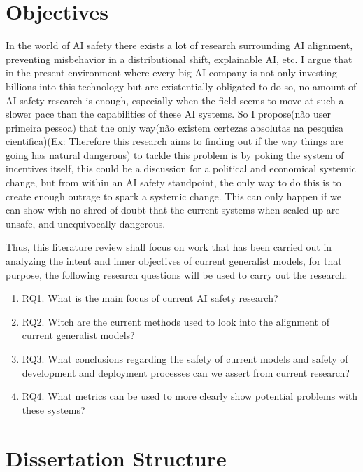 \section{Objectives}

In the world of AI safety there exists a lot of research surrounding AI alignment, preventing misbehavior in a distributional shift, explainable AI, etc. I argue that in the present environment where every big AI company is not only investing billions into this technology but are existentially obligated to do so, no amount of AI safety research is enough, especially when the field seems to move at such a slower pace than the capabilities of these AI systems. So I propose(não user primeira pessoa) that the only way(não existem certezas absolutas na pesquisa cientifica)(Ex: Therefore this research aims to finding out if the way things are going has natural dangerous) to tackle this problem is by poking the system of incentives itself, this could be a discussion for a political and economical systemic change, but from within an AI safety standpoint, the only way to do this is to create enough outrage to spark a systemic change. This can only happen if we can show with no shred of doubt that the current systems when scaled up are unsafe, and unequivocally dangerous. %

Thus, this literature review shall focus on work that has been carried out in analyzing the intent and inner objectives of current generalist models, for that purpose, the following research questions will be used to carry out the research:

\begin{enumerate}
    \item RQ1. What is the main focus of current AI safety research?  
    \item RQ2. Witch are the current methods used to look into the alignment of current generalist models?
    \item RQ3. What conclusions regarding the safety of current models and safety of development and deployment processes can we assert from current research?
    \item RQ4. What metrics can be used to more clearly show potential problems with these systems? 
\end{enumerate}

\section{Dissertation Structure}

\newpage
